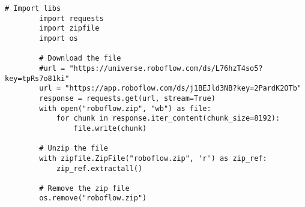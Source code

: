     \begin{lstlisting}[caption={get\_dataset.py}]
        # Import libs
        import requests
        import zipfile
        import os
        
        # Download the file
        #url = "https://universe.roboflow.com/ds/L76hzT4so5?key=tpRs7o81ki"
        url = "https://app.roboflow.com/ds/j1BEJld3NB?key=2PardK2OTb"
        response = requests.get(url, stream=True)
        with open("roboflow.zip", "wb") as file:
            for chunk in response.iter_content(chunk_size=8192):
                file.write(chunk)
        
        # Unzip the file
        with zipfile.ZipFile("roboflow.zip", 'r') as zip_ref:
            zip_ref.extractall()
        
        # Remove the zip file
        os.remove("roboflow.zip")
    \end{lstlisting}

